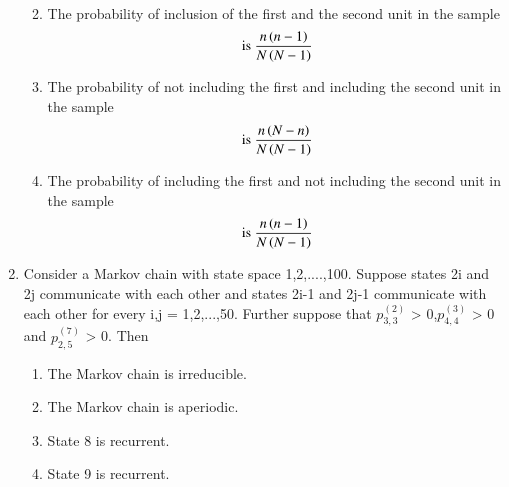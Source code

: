 \begin{enumerate}[label=\thesection.\arabic*.,ref=\thesection.\theenumi]
\begin{enumerate}
\begin{align}
    \end{align}
    \item The probability of inclusion of the first and the second unit in the sample
    \begin{align}
        \text{ is } \frac{n \left(n-1\right)}{N \left(N-1\right)}
    \end{align}
    \item The probability of not including the first and including the second unit in the sample
    \begin{align}
        \text{ is } \frac{n \left(N-n\right)}{N \left(N-1\right)}
    \end{align}
    \item The probability of including the first and not including the second unit in the sample
    \begin{align}
        \text{ is } \frac{n \left(n-1\right)}{N \left(N-1\right)}
    \end{align}
\end{enumerate}
%
\solution

%
\item Consider a Markov chain with state space {1,2,....,100}. Suppose states 2i and 2j communicate with each other and states 2i-1 and 2j-1 communicate with each other for every i,j = 1,2,...,50. Further suppose that $p^{(2)}_{3,3}$ > 0,$p^{(3)}_{4,4}$ > 0 and $p^{(7)}_{2,5}$ > 0. Then 
\begin{enumerate}
\item The Markov chain is irreducible.
\item The Markov chain is aperiodic.
\item State 8 is recurrent.
\item State 9 is recurrent.
\end{enumerate}
%
\solution




\end{enumerate}
